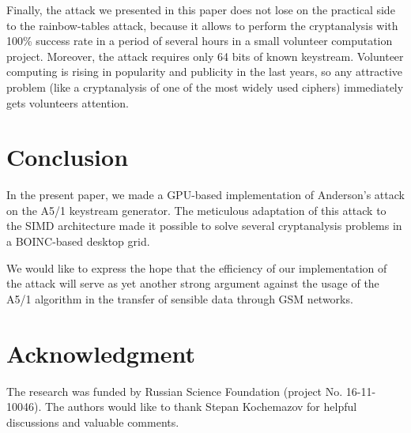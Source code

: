 \documentclass[runningheads,a4paper]{llncs}[2015/06/24]
\begin{document}
Finally, the attack we presented in this paper does not lose on the practical
side to the rainbow-tables attack, because it allows to perform the
cryptanalysis with 100\% success rate in a period of several hours in a small
volunteer computation project. Moreover, the attack requires only 64 bits of
known keystream. Volunteer computing is rising in popularity and
publicity in the last years, so any attractive problem (like a cryptanalysis of one
of the most widely used ciphers) immediately gets volunteers attention.

\section{Conclusion}
\label{concl}
In the present paper, we made a GPU-based implementation of Anderson's attack on the A5/1 keystream generator. The meticulous adaptation of this attack to the SIMD architecture made it possible to solve several cryptanalysis problems in a BOINC-based desktop grid.

We would like to express the hope that the efficiency of our implementation of the attack will serve as yet another strong argument against the usage of the A5/1 algorithm in the transfer of sensible data through GSM networks.

\section*{Acknowledgment}
The research was funded by Russian Science Foundation (project No. 16-11-10046). The authors would like to thank Stepan Kochemazov for helpful discussions and valuable comments.



\end{document}
